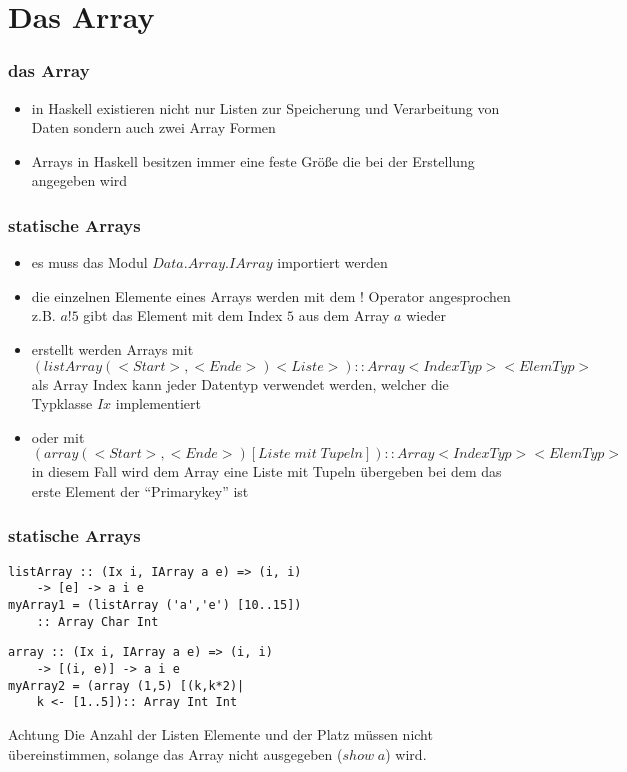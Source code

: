 \subtitle{Tag vier - ein bisschen noch} 
\date{28.03.2014}

\begin{frame}[plain]
\titlepage
\end{frame}

\section{Das Array}
\begin{frame}
\frametitle{das Array}
\begin{itemize}
	\item in Haskell existieren nicht nur Listen zur Speicherung und Verarbeitung von Daten sondern auch zwei Array Formen
	\item Arrays in Haskell besitzen immer eine feste Größe die bei der Erstellung angegeben wird
\end{itemize}
\end{frame}

\begin{frame}
\frametitle{statische Arrays}
\begin{itemize}
	\item es muss das Modul $Data.Array.IArray$ importiert werden
	\item die einzelnen Elemente eines Arrays werden mit dem $!$ Operator angesprochen\\ z.B. $a!5$ gibt das Element mit dem Index $5$ aus dem Array $a$ wieder
	\item erstellt werden Arrays mit $(listArray (<Start>,<Ende>) <Liste>) :: Array <IndexTyp> <ElemTyp>$
	\\als Array Index kann jeder Datentyp verwendet werden, welcher die Typklasse $Ix$ implementiert 
	\item oder mit $(array (<Start>, <Ende>) [Liste\;mit\;Tupeln]) :: Array <IndexTyp> <ElemTyp>$
	\\ in diesem Fall wird dem Array eine Liste mit Tupeln übergeben bei dem das erste Element der "`Primarykey"' ist
\end{itemize}
\end{frame}

\begin{frame}[fragile]
\frametitle{statische Arrays}
\begin{lstlisting}
listArray :: (Ix i, IArray a e) => (i, i) 
    -> [e] -> a i e
myArray1 = (listArray ('a','e') [10..15]) 
    :: Array Char Int
\end{lstlisting}	
\pause
\begin{lstlisting}
array :: (Ix i, IArray a e) => (i, i) 
    -> [(i, e)] -> a i e
myArray2 = (array (1,5) [(k,k*2)| 
    k <- [1..5]):: Array Int Int
\end{lstlisting}
\begin{alertblock}{Achtung}
Die Anzahl der Listen Elemente und der Platz müssen nicht übereinstimmen, solange das Array nicht ausgegeben ($show\; a$) wird. 
\end{alertblock}
\end{frame}

